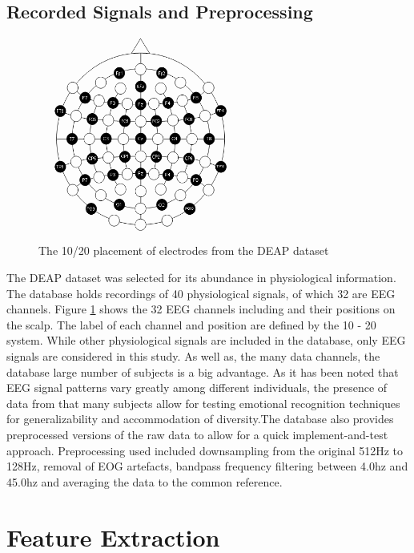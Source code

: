 \documentclass[12pt, a4paper, fleqn]{memoir}%
\begin{document}
\section{Recorded Signals and Preprocessing}
\label{sec:preprocessing}

\begin{figure}[h]
	\centering
	\includegraphics[width=0.6\textwidth]{pic.png}
	\caption{The 10/20 placement of electrodes from the DEAP dataset}
	\label{fig:eeg}
\end{figure}

The DEAP dataset was selected for its abundance in physiological information. The database holds recordings of 40 physiological signals, of which 32 are EEG channels. Figure \ref{fig:eeg} shows the 32 EEG channels including and their positions on the scalp. The label of each channel and position are defined by the 10 - 20 system. While other physiological signals are included in the database, only EEG signals are considered in this study. As well as, the many data channels, the database large number of subjects is a big advantage. As it has been noted that EEG signal patterns vary greatly among different individuals, the presence of data from that many subjects allow for testing emotional recognition techniques for generalizability and accommodation of diversity.The database also provides preprocessed versions of the raw data to allow for a quick implement-and-test approach. Preprocessing used included downsampling from the original 512Hz to 128Hz, removal of EOG artefacts, bandpass frequency filtering between 4.0hz and 45.0hz and averaging the data to the common reference.

\chapter{Feature Extraction}
\label{chap:FeatureExtraction}
\end{document}
